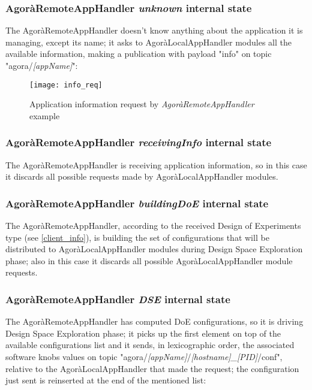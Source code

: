 \subsubsection{AgoràRemoteAppHandler \textit{unknown} internal state}\label{req_info}

The AgoràRemoteAppHandler doesn't know anything about the application it is managing, except its name; it asks to AgoràLocalAppHandler modules all the available information, making a publication with payload "info" on topic "agora/\textit{[appName]}":

\begin{figure}[H]

    \centering
    \texttt{[image: info\_req]}
    \caption{Application information request by \textit{AgoràRemoteAppHandler} example}
    
\end{figure}


\subsubsection{AgoràRemoteAppHandler \textit{receivingInfo} internal state}

The AgoràRemoteAppHandler is receiving application information, so in this case it discards all possible requests made by AgoràLocalAppHandler modules.


\subsubsection{AgoràRemoteAppHandler \textit{buildingDoE} internal state}

The AgoràRemoteAppHandler, according to the received Design of Experiments type (see \ref{client_info}), is building the set of configurations that will be distributed to AgoràLocalAppHandler modules during Design Space Exploration phase; also in this case it discards all possible AgoràLocalAppHandler module requests.


\subsubsection{AgoràRemoteAppHandler \textit{DSE} internal state}\label{dse_conf}

The AgoràRemoteAppHandler has computed DoE configurations, so it is driving Design Space Exploration phase; it picks up the first element on top of the available configurations list and it sends, in lexicographic order, the associated software knobs values on topic "agora\slash{}\textit{[appName]}\slash{}\textit{[hostname]\_[PID]}\slash{}conf", relative to the AgoràLocalAppHandler that made the request; the configuration just sent is reinserted at the end of the mentioned list:

